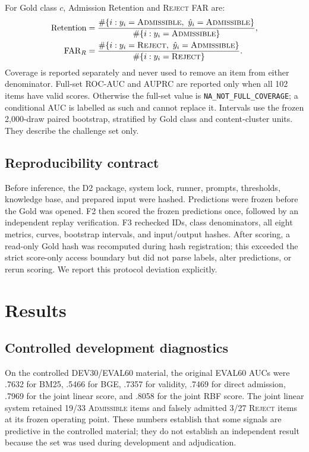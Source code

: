 \documentclass[5p,times]{elsarticle}
\newcommand{\admissible}{\mbox{\textsc{Admissible}}}
\newcommand{\reject}{\mbox{\textsc{Reject}}}
\begin{document}
For Gold class $c$, Admission Retention and \reject{} FAR are:
{\small
\begin{equation}
 \begin{aligned}
 \mathrm{Retention}&=\frac{\#\{i:y_i=\admissible{},\ \hat y_i=\admissible{}\}}{\#\{i:y_i=\admissible{}\}},\\
 \mathrm{FAR}_{R}&=\frac{\#\{i:y_i=\reject{},\ \hat y_i=\admissible{}\}}{\#\{i:y_i=\reject{}\}}.
 \end{aligned}
\end{equation}
}
Coverage is reported separately and never used to remove an item from either denominator. Full-set ROC-AUC and AUPRC are reported only when all 102 items have valid scores. Otherwise the full-set value is \nolinkurl{NA_NOT_FULL_COVERAGE}; a conditional AUC is labelled as such and cannot replace it. Intervals use the frozen 2,000-draw paired bootstrap, stratified by Gold class and content-cluster units. They describe the challenge set only.

\subsection{Reproducibility contract}

Before inference, the D2 package, system lock, runner, prompts, thresholds, knowledge base, and prepared input were hashed. Predictions were frozen before the Gold was opened. F2 then scored the frozen predictions once, followed by an independent replay verification. F3 rechecked IDs, class denominators, all eight metrics, curves, bootstrap intervals, and input/output hashes. After scoring, a read-only Gold hash was recomputed during hash registration; this exceeded the strict score-only access boundary but did not parse labels, alter predictions, or rerun scoring. We report this protocol deviation explicitly.

\section{Results}
\label{sec:results}

\subsection{Controlled development diagnostics}

On the controlled DEV30/EVAL60 material, the original EVAL60 AUCs were .7632 for BM25, .5466 for BGE, .7357 for validity, .7469 for direct admission, .7969 for the joint linear score, and .8058 for the joint RBF score. The joint linear system retained 19/33 \admissible{} items and falsely admitted 3/27 \reject{} items at its frozen operating point. These numbers establish that some signals are predictive in the controlled material; they do not establish an independent result because the set was used during development and adjudication.
\end{document}
